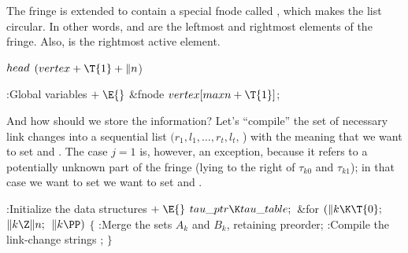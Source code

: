 The fringe is extended to contain a special fnode called
,
which makes the list circular. In other words,  and %
are the leftmost and rightmost elements of the fringe. Also,
 is the rightmost active element.

\Y\B\4\D$\\{head}$ \5
$(\\{vertex}+\T{1}+\|n{}$)\par
\Y\B\4:Global variables\X${}\mathrel+\E{}$\6
\&{fnode} ${}\\{vertex}[\\{maxn}+\T{1}]{}$;\par
\fi

And how should we store the  information?
Let's ``compile'' the
set of necessary link changes into a sequential list $(r_1,l_1,
\ldots, r_t, l_t,\,$\PB{$\NULL$}) with the meaning that
we want to set 
and .
The case $j=1$ is, however, an exception, because it refers to a
potentially unknown part of the fringe (lying to the right of
$\tau_{k0}$ and $\tau_{k1}$); in that case we want to set
we want to set 
and .

\Y\B\4:Initialize the data structures\X${}\mathrel+\E{}$\6
$\\{tau\_ptr}\K\\{tau\_table};{}$\6
\&{for} ${}(\|k\K\T{0};{}$ ${}\|k\Z\|n;{}$ ${}\|k\PP){}$\5
${}\{{}$\1\6
:Merge the sets $A_k$ and $B_k$, retaining preorder\X;\6
:Compile the link-change strings \X;\6
\4${}\}{}$\2\par
\fi

